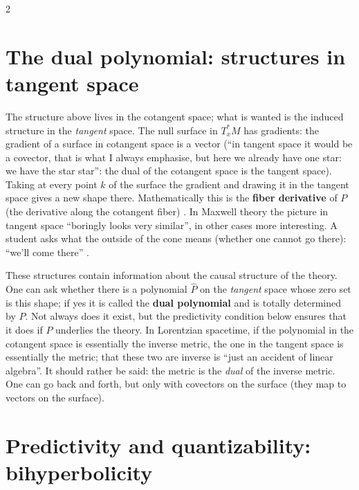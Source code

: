 \begin{paracol}{2}
\section{The dual polynomial: structures in tangent space}\label{sec:c26-dual}

The structure above lives in the cotangent space; what is wanted is the induced structure in the \emph{tangent} space. The null surface in $T_x^*M$ has gradients: the gradient of a surface in cotangent space is a vector (``in tangent space it would be a covector, that is what I always emphasise, but here we already have one star: we have the star star'': the dual of the cotangent space is the tangent space). Taking at every point $k$ of the surface the gradient and drawing it in the tangent space gives a new shape there. Mathematically this is the \textbf{fiber derivative} of $P$ (the derivative along the cotangent fiber) . In Maxwell theory the picture in tangent space ``boringly looks very similar'', in other cases more interesting. A student asks what the outside of the cone means (whether one cannot go there): ``we'll come there'' .

\begin{definition}\label{def:c26-dual}
These structures contain information about the causal structure of the theory. One can ask whether there is a polynomial $\hat P$ on the \emph{tangent} space whose zero set is this shape; if yes it is called the \textbf{dual polynomial} and is totally determined by $P$. Not always does it exist, but the predictivity condition below ensures that it does if $P$ underlies the theory. In Lorentzian spacetime, if the polynomial in the cotangent space is essentially the inverse metric, the one in the tangent space is essentially the metric; that these two are inverse is ``just an accident of linear algebra''. It should rather be said: the metric is the \emph{dual} of the inverse metric. One can go back and forth, but only with covectors on the surface (they map to vectors on the surface).
\end{definition}

\section{Predictivity and quantizability: bihyperbolicity}\label{sec:c26-bihyp}


\end{paracol}
